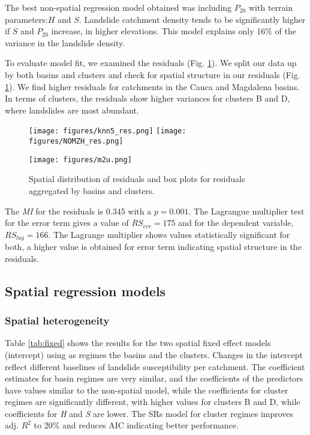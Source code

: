 \documentclass[
  manuscript=article,  
  layout=preprint,  
  year=2023,
  volume=0,
]{format}
\begin{document}
\par The best non-spatial regression model obtained was including $P_{20}$ with terrain parameters:$H$ and $S$. Landslide catchment density tends to be significantly higher if $S$ and $P_{20}$ increase, in higher elevations. This model explains only 16\% of the variance in the landslide density.

\par To evaluate model fit, we examined the residuals (Fig. \ref{fig:residuals}). We split our data up by both basins and clusters and check for spatial structure in our residuals (Fig. \ref{fig:residuals}). We find higher residuals for catchments in the Cauca and Magdalena basins. In terms of clusters, the residuals show higher variances for clusters B and D, where landslides are most abundant.

\begin{figure}[ht!]
  \begin{minipage}{.48\linewidth}
    \centering
      {\texttt{[image: figures/knn5\_res.png]}}
      {\texttt{[image: figures/NOMZH\_res.png]}}
  \end{minipage}\quad
  \begin{minipage}{.48\linewidth}
    \centering
      {\texttt{[image: figures/m2u.png]}}
  \end{minipage}
    \caption{Spatial distribution of residuals and box plots for residuals aggregated by basins and clusters.}
    \label{fig:residuals}
\end{figure}

\par The \textit{MI} for the residuals is 0.345 with a $p = 0.001$. The Lagrangue multiplier test for the error term gives a value of $RS_{err}=175$ and for the dependent variable, $RS_{lag}=166$. The Lagrange multiplier shows values statistically significant for both, a higher value is obtained for error term indicating spatial structure in the residuals.

\subsection{Spatial regression models}

\subsubsection{Spatial heterogeneity}
\par Table \ref{tab:fixed} shows the results for the two spatial fixed effect models (intercept) using as regimes the basins and the clusters. Changes in the intercept reflect different baselines of landslide susceptibility per catchment. The coefficient estimates for basin regimes are very similar, and the coefficients of the predictors have values similar to the non-spatial model, while the coefficients for cluster regimes are significantly different, with higher values for clusters B and D, while coefficients for \textit{H} and \textit{S} are lower. The SRs model for cluster regimes improves adj. $R^2$ to 20\% and reduces AIC indicating better performance. 
\end{document}
